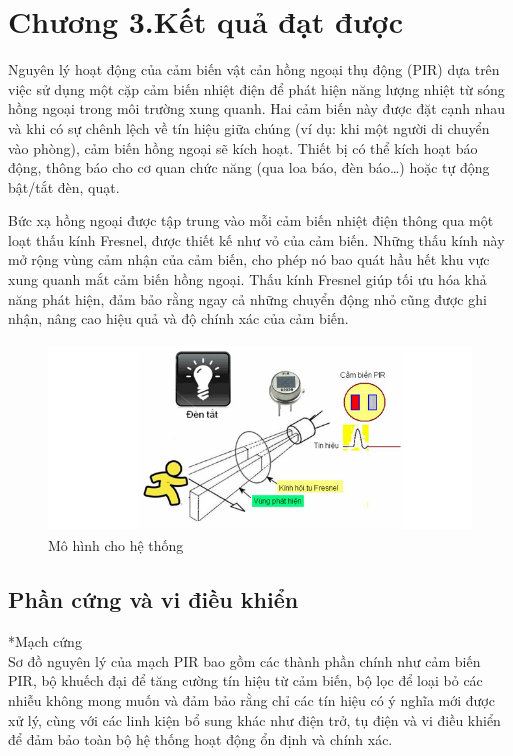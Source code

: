 \documentclass{article}
\begin{document}
\section*{Chương 3.Kết quả đạt được}
\setcounter{section}{3}
\setcounter{subsection}{0}
Nguyên lý hoạt động của cảm biến vật cản hồng ngoại thụ động (PIR) dựa trên việc sử dụng một cặp cảm biến nhiệt điện để phát hiện năng lượng nhiệt từ sóng hồng ngoại trong môi trường xung quanh. Hai cảm biến này được đặt cạnh nhau và khi có sự chênh lệch về tín hiệu giữa chúng (ví dụ: khi một người di chuyển vào phòng), cảm biến hồng ngoại sẽ kích hoạt. Thiết bị có thể kích hoạt báo động, thông báo cho cơ quan chức năng (qua loa báo, đèn báo…) hoặc tự động bật/tắt đèn, quạt.

Bức xạ hồng ngoại được tập trung vào mỗi cảm biến nhiệt điện thông qua một loạt thấu kính Fresnel, được thiết kế như vỏ của cảm biến. Những thấu kính này mở rộng vùng cảm nhận của cảm biến, cho phép nó bao quát hầu hết khu vực xung quanh mắt cảm biến hồng ngoại. Thấu kính Fresnel giúp tối ưu hóa khả năng phát hiện, đảm bảo rằng ngay cả những chuyển động nhỏ cũng được ghi nhận, nâng cao hiệu quả và độ chính xác của cảm biến.
\begin{figure}[H]
    \centering
    \includegraphics[width=12cm,height=5cm]{image/anh5.png}
    \caption{Mô hình cho hệ thống} \label{EV}
\end{figure}
\subsection{Phần cứng và vi điều khiển}
*Mạch cứng\\
Sơ đồ nguyên lý của mạch PIR bao gồm các thành phần chính như cảm biến PIR, bộ khuếch đại để tăng cường tín hiệu từ cảm biến, bộ lọc để loại bỏ các nhiễu không mong muốn và đảm bảo rằng chỉ các tín hiệu có ý nghĩa mới được xử lý, cùng với các linh kiện bổ sung khác như điện trở, tụ điện và vi điều khiển để đảm bảo toàn bộ hệ thống hoạt động ổn định và chính xác.
 
\end{document}
